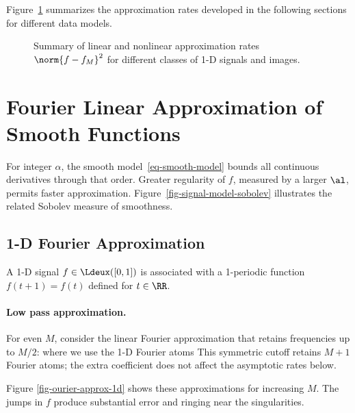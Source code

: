 Figure~\ref{fig-approx-comparaison} summarizes the approximation rates developed in the following sections for different data models.

\begin{figure}[tbp]
\centering
{}
\caption{Summary of linear and nonlinear approximation rates
	$\norm{f-f_M}^2$ for different classes of 1-D signals and images.}
\label{fig-approx-comparaison}
\end{figure}


\section{Fourier Linear Approximation of Smooth Functions}

For integer $\alpha$, the smooth model~\eqref{eq-smooth-model} bounds all continuous derivatives through that order. Greater regularity of $f$, measured by a larger $\al$, permits faster approximation. Figure~\ref{fig-signal-model-sobolev} illustrates the related Sobolev measure of smoothness.

\subsection{1-D Fourier Approximation}

A 1-D signal $f \in \Ldeux([0,1])$ is associated with a 1-periodic function $f(t+1)=f(t)$ defined for $t \in \RR$.

\paragraph{Low pass approximation.}

For even $M$, consider the linear Fourier approximation that retains frequencies up to $M/2$:
where we use the 1-D Fourier atoms
This symmetric cutoff retains $M+1$ Fourier atoms; the extra coefficient does not affect the asymptotic rates below.

Figure \ref{fig-ourier-approx-1d} shows these approximations for increasing $M$. The jumps in $f$ produce substantial error and ringing near the singularities.


